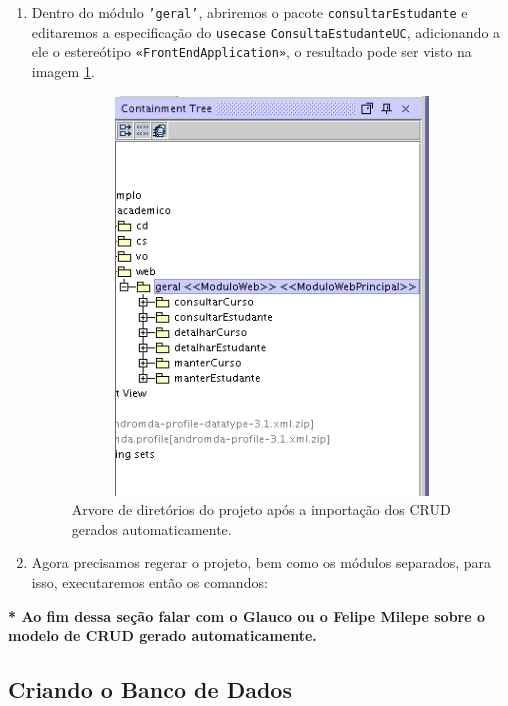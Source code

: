 \begin{enumerate}
\item Dentro do módulo \texttt{'geral'}, abriremos o pacote
\texttt{consultarEstudante} e editaremos a especificação do \texttt{usecase}
\texttt{ConsultaEstudanteUC}, adicionando a ele o estereótipo
\texttt{«FrontEndApplication»}, o resultado
pode ser visto na imagem \ref{resultado_usecase_principal}.

\begin{figure}[H]
	\centering
	\includegraphics[width=300pt,height=300pt]{imgs/tutorial-mdarte-0025.png}
	\caption{Arvore de diretórios do projeto após a importação dos CRUD gerados
	automaticamente.}
	\label{resultado_usecase_principal}
\end{figure}

\item Agora precisamos regerar o projeto, bem como os módulos separados, para
isso, executaremos então os comandos:
	
\begin{framed}
	
\end{framed}

\end{enumerate}

\textbf{* Ao fim dessa seção falar com o Glauco ou o Felipe Milepe sobre o
modelo de CRUD gerado automaticamente.}

\subsection{Criando o Banco de Dados}

